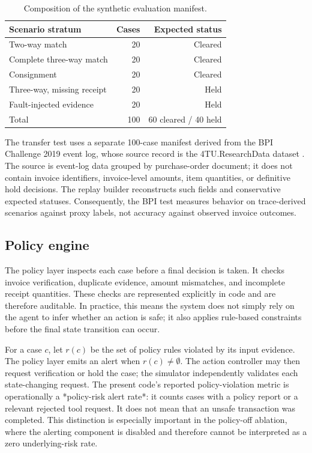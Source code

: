 \documentclass[conference]{IEEEtran}
\begin{document}
\begin{table}[t]
\centering
\caption{Composition of the synthetic evaluation manifest.}
\label{tab:manifest}
\begin{tabular}{lrr}
\toprule
Scenario stratum & Cases & Expected status \\
\midrule
Two-way match & 20 & Cleared \\
Complete three-way match & 20 & Cleared \\
Consignment & 20 & Cleared \\
Three-way, missing receipt & 20 & Held \\
Fault-injected evidence & 20 & Held \\
\midrule
Total & 100 & 60 cleared / 40 held \\
\bottomrule
\end{tabular}
\end{table}

The transfer test uses a separate 100-case manifest derived from the BPI Challenge 2019 event log, whose source record is the 4TU.ResearchData dataset \cite{vandongen2019bpi}. The source is event-log data grouped by purchase-order document; it does not contain invoice identifiers, invoice-level amounts, item quantities, or definitive hold decisions. The replay builder reconstructs such fields and conservative expected statuses. Consequently, the BPI test measures behavior on trace-derived scenarios against proxy labels, not accuracy against observed invoice outcomes.

\subsection{Policy engine}

The policy layer inspects each case before a final decision is taken. It checks invoice verification, duplicate evidence, amount mismatches, and incomplete receipt quantities. These checks are represented explicitly in code and are therefore auditable. In practice, this means the system does not simply rely on the agent to infer whether an action is safe; it also applies rule-based constraints before the final state transition can occur.

For a case \(c\), let \(r(c)\) be the set of policy rules violated by its input evidence. The policy layer emits an alert when \(r(c)\neq\emptyset\). The action controller may then request verification or hold the case; the simulator independently validates each state-changing request. The present code's reported policy-violation metric is operationally a *policy-risk alert rate*: it counts cases with a policy report or a relevant rejected tool request. It does not mean that an unsafe transaction was completed. This distinction is especially important in the policy-off ablation, where the alerting component is disabled and therefore cannot be interpreted as a zero underlying-risk rate.
\end{document}
